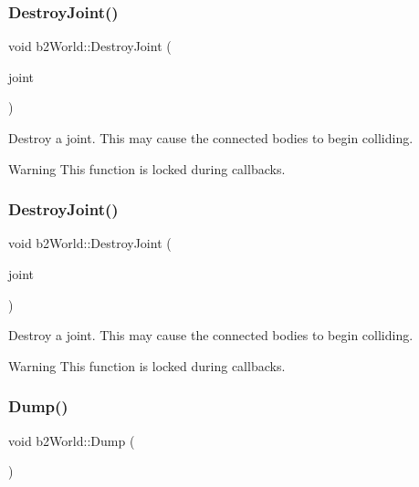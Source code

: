\subsubsection{\texorpdfstring{Destroy\+Joint()}{DestroyJoint()}\hspace{0.1cm}{\footnotesize\ttfamily [1/2]}}
{\footnotesize\ttfamily void b2\+World\+::\+Destroy\+Joint (\begin{DoxyParamCaption}\item[{\hyperlink{classb2Joint}{b2\+Joint} $\ast$}]{joint }\end{DoxyParamCaption})}

Destroy a joint. This may cause the connected bodies to begin colliding. \begin{DoxyWarning}{Warning}
This function is locked during callbacks. 
\end{DoxyWarning}
\mbox{\label{classb2World_add5942aef171e54cfa384c8975746dca}} 
\subsubsection{\texorpdfstring{Destroy\+Joint()}{DestroyJoint()}\hspace{0.1cm}{\footnotesize\ttfamily [2/2]}}
{\footnotesize\ttfamily void b2\+World\+::\+Destroy\+Joint (\begin{DoxyParamCaption}\item[{\hyperlink{classb2Joint}{b2\+Joint} $\ast$}]{joint }\end{DoxyParamCaption})}

Destroy a joint. This may cause the connected bodies to begin colliding. \begin{DoxyWarning}{Warning}
This function is locked during callbacks. 
\end{DoxyWarning}
\mbox{\label{classb2World_a73c1fec260d460514edd335d4c235893}} 
\subsubsection{\texorpdfstring{Dump()}{Dump()}\hspace{0.1cm}{\footnotesize\ttfamily [1/2]}}
{\footnotesize\ttfamily void b2\+World\+::\+Dump (\begin{DoxyParamCaption}{ }\end{DoxyParamCaption})}

